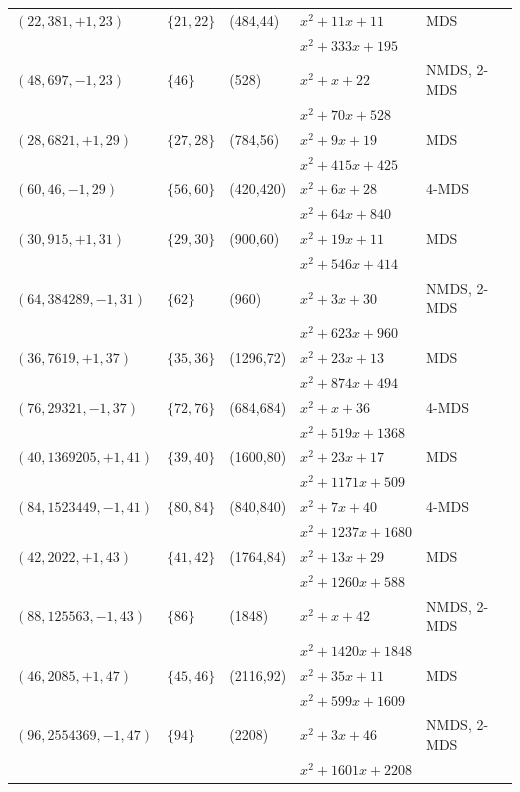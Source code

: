 \documentclass[12pt,reqno]{amsart}
\begin{document}
\begin{table}[htbp]
{\begin{tabular}{lllll}
		$(22,381,+1,23)$ & $\{21,22\}$ & (484,44) &  $x^2 +11x +11$ & MDS\\
& & & $x^2 + 333x + 195$ & \\

		$(48,697,-1,23)$ & $\{46\}$ & (528) &  $x^2 +x +22$ & NMDS, 2-MDS\\
& & & $x^2 + 70x + 528$ & \\

\hline
		$(28,6821,+1,29)$ & $\{27,28\}$ & (784,56) &  $x^2 +9x +19$ & MDS\\
& & & $x^2 + 415x + 425$ & \\

		$(60,46,-1,29)$ & $\{56,60\}$ & (420,420) &  $x^2 +6x +28$ & 4-MDS\\
& & & $x^2 + 64x + 840$ & \\

\hline
		$(30,915,+1,31)$ & $\{29,30\}$ & (900,60) &  $x^2 +19x +11$ & MDS\\
& & & $x^2 + 546x + 414$ & \\

		$(64,384289,-1,31)$ & $\{62\}$ & (960) &  $x^2 +3x +30$ & NMDS, 2-MDS\\
& & & $x^2 + 623x + 960$ & \\

\hline
		$(36,7619,+1,37)$ & $\{35,36\}$ & (1296,72) &  $x^2 +23x +13$ & MDS\\
& & & $ x^2 + 874x + 494 $ & \\

		$(76,29321,-1,37)$ & $\{72,76\}$ & (684,684) &  $x^2 +x +36$ & 4-MDS\\
& & & $x^2 + 519x + 1368$ & \\

\hline
		$(40,1369205,+1,41)$ & $\{39,40\}$ & (1600,80) &  $x^2 +23x +17$ & MDS\\
& & & $x^2 + 1171x + 509$ & \\

		$(84,1523449,-1,41)$ & $\{80,84\}$ & (840,840) &  $x^2 +7x +40$ & 4-MDS\\
& & & $x^2 + 1237x + 1680$ & \\

\hline
		$(42,2022,+1,43)$ & $\{41,42\}$ & (1764,84) &  $x^2 +13x +29$ & MDS\\
& & & $x^2 + 1260x + 588$ & \\

		$(88,125563,-1,43)$ & $\{86\}$ & (1848) &  $x^2 +x +42$ & NMDS, 2-MDS \\
& & & $x^2 + 1420x + 1848$ & \\

\hline
		$(46,2085,+1,47)$ & $\{45,46\}$ & (2116,92) &  $x^2 +35x +11$ & MDS\\
& & & $x^2 + 599x + 1609$ & \\

		$(96,2554369,-1,47)$ & $\{94\}$ & (2208) &  $x^2 + 3x +46$ & NMDS, 2-MDS \\
& & & $x^2 + 1601x + 2208$ & \\

		\bottomrule
	\end{tabular}
}
\end{table}
\end{document}
